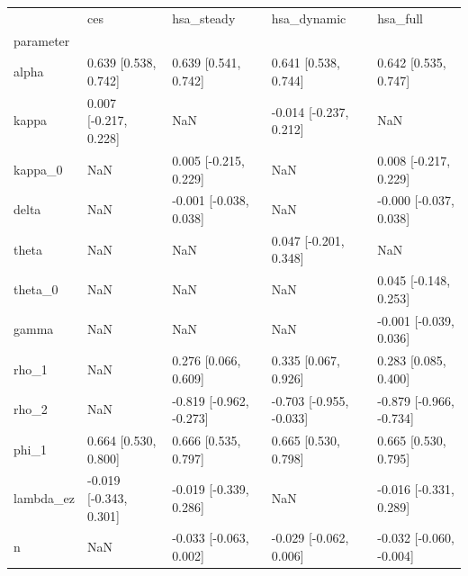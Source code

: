 \begin{tabular}{lllll}
\toprule
 & ces & hsa\_steady & hsa\_dynamic & hsa\_full \\
parameter &  &  &  &  \\
\midrule
alpha & 0.639 [0.538, 0.742] & 0.639 [0.541, 0.742] & 0.641 [0.538, 0.744] & 0.642 [0.535, 0.747] \\
kappa & 0.007 [-0.217, 0.228] & NaN & -0.014 [-0.237, 0.212] & NaN \\
kappa\_0 & NaN & 0.005 [-0.215, 0.229] & NaN & 0.008 [-0.217, 0.229] \\
delta & NaN & -0.001 [-0.038, 0.038] & NaN & -0.000 [-0.037, 0.038] \\
theta & NaN & NaN & 0.047 [-0.201, 0.348] & NaN \\
theta\_0 & NaN & NaN & NaN & 0.045 [-0.148, 0.253] \\
gamma & NaN & NaN & NaN & -0.001 [-0.039, 0.036] \\
rho\_1 & NaN & 0.276 [0.066, 0.609] & 0.335 [0.067, 0.926] & 0.283 [0.085, 0.400] \\
rho\_2 & NaN & -0.819 [-0.962, -0.273] & -0.703 [-0.955, -0.033] & -0.879 [-0.966, -0.734] \\
phi\_1 & 0.664 [0.530, 0.800] & 0.666 [0.535, 0.797] & 0.665 [0.530, 0.798] & 0.665 [0.530, 0.795] \\
lambda\_ez & -0.019 [-0.343, 0.301] & -0.019 [-0.339, 0.286] & NaN & -0.016 [-0.331, 0.289] \\
n & NaN & -0.033 [-0.063, 0.002] & -0.029 [-0.062, 0.006] & -0.032 [-0.060, -0.004] \\
\bottomrule
\end{tabular}
